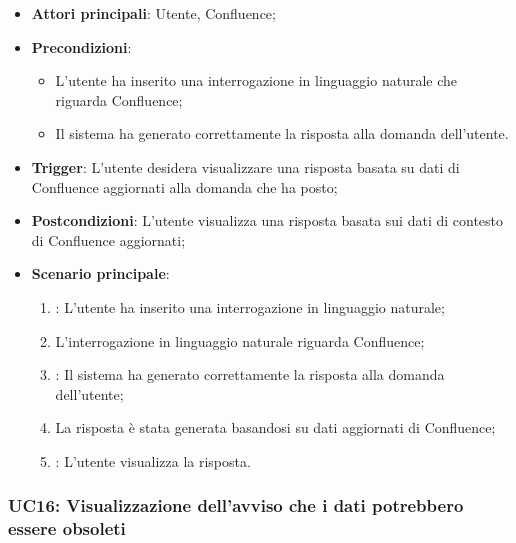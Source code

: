 \begin{itemize}
    \item \textbf{Attori principali}: Utente, Confluence;
    \item \textbf{Precondizioni}: 
    \begin{itemize}
        \item L'utente ha inserito una interrogazione in linguaggio naturale che riguarda Confluence;
        \item Il sistema ha generato correttamente la risposta alla domanda dell'utente.
    \end{itemize}
    \item \textbf{Trigger}: L'utente desidera visualizzare una risposta basata su dati di Confluence aggiornati alla domanda che ha posto;
    \item \textbf{Postcondizioni}: L'utente visualizza una risposta basata sui dati di contesto di Confluence aggiornati;
    \item \textbf{Scenario principale}: 
    \begin{enumerate}
        \item {}: L'utente ha inserito una interrogazione in linguaggio naturale;
        \item L'interrogazione in linguaggio naturale riguarda Confluence;
        \item {}: Il sistema ha generato correttamente la risposta alla domanda dell'utente;
        \item La risposta è stata generata basandosi su dati aggiornati di Confluence;
        \item {}: L'utente visualizza la risposta.
    \end{enumerate}
\end{itemize}



\hypertarget{UC16}{}
\subsubsection{UC16: Visualizzazione dell’avviso che i dati potrebbero essere obsoleti}

